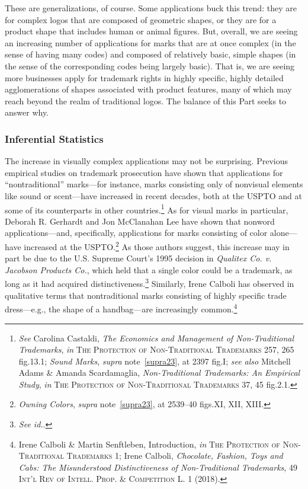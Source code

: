 \documentclass[letterpaper, 11pt, oneside]{article}
\begin{document}
These are generalizations, of course. Some applications buck this trend: they are for complex logos that are composed of geometric shapes, or they are for a product shape that includes human or animal figures. But, overall, we are seeing an increasing number of applications for marks that are at once complex (in the sense of having many codes) and composed of relatively basic, simple shapes (in the sense of the corresponding codes being largely basic). That is, we are seeing more businesses apply for trademark rights in highly specific, highly detailed agglomerations of shapes associated with product features, many of which may reach beyond the realm of traditional logos. The balance of this Part seeks to answer why.

\subsubsection{Inferential Statistics}\label{subsubsec:2B2}

The increase in visually complex applications may not be surprising. Previous empirical studies on trademark prosecution have shown that applications for ``nontraditional'' marks—for instance, marks consisting only of nonvisual elements like sound or scent—have increased in recent decades, both at the USPTO and at some of its counterparts in other countries.\footnote{\textit{See} Carolina Castaldi, 
\textit{The Economics and Management of Non-Traditional Trademarks}, \textit{in} \textsc{The Protection of Non-Traditional Trademarks} 257, 265 fig.13.1; \textit{Sound Marks}, \textit{supra} note~\ref{supra23}, at 2397 fig.I; \textit{see also} Mitchell Adams \& Amanda Scardamaglia, \textit{Non-Traditional Trademarks: An Empirical Study}, \textit{in} \textsc{The Protection of Non-Traditional Trademarks} 37, 45 fig.2.1.} As for visual marks in particular, Deborah R. Gerhardt and Jon McClanahan Lee have shown that nonword applications—and, specifically, applications for marks consisting of color alone—have increased at the USPTO.\footnote{\textit{Owning Colors}, \textit{supra} note~\ref{supra23}, at 2539–40 figs.XI, XII, XIII.} As those authors suggest, this increase may in part be due to the U.S. Supreme Court's 1995 decision in \textit{Qualitex Co. v. Jacobson Products Co.}, which held that a single color could be a trademark, as long as it had acquired distinctiveness.\footnote{\textit{See id.}.} Similarly, Irene Calboli has observed in qualitative terms that nontraditional marks consisting of highly specific trade dress—e.g., the shape of a handbag—are increasingly common.\footnote{Irene Calboli \& Martin Senftleben, Introduction, \textit{in} \textsc{The Protection of Non-Traditional Trademarks} 1; Irene Calboli, \textit{Chocolate, Fashion, Toys and Cabs: The Misunderstood Distinctiveness of Non-Traditional Trademarks}, 49 \textsc{Int'l Rev of Intell. Prop. \& Competition L.} 1 (2018).}
\end{document}
